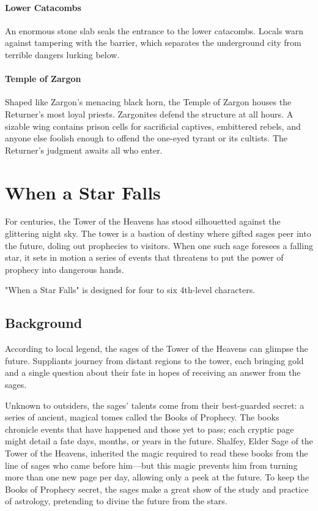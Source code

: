 \documentclass[10pt,a4paper,twoside,bg=print,twocolumn,openany,nodeprecatedcode]{dndbook}
\begin{document}
\subsubsection{Lower Catacombs}
An enormous stone slab seals the entrance to the lower catacombs. Locals warn against tampering with the barrier, which separates the underground city from terrible dangers lurking below.

\subsubsection{Temple of Zargon}
Shaped like Zargon's menacing black horn, the Temple of Zargon houses the Returner's most loyal priests. Zargonites defend the structure at all hours. A sizable wing contains prison cells for sacrificial captives, embittered rebels, and anyone else foolish enough to offend the one-eyed tyrant or its cultists. The Returner's judgment awaits all who enter.

\chapter{When a Star Falls}
For centuries, the Tower of the Heavens has stood silhouetted against the glittering night sky. The tower is a bastion of destiny where gifted sages peer into the future, doling out prophecies to visitors. When one such sage foresees a falling star, it sets in motion a series of events that threatens to put the power of prophecy into dangerous hands.

"When a Star Falls" is designed for four to six 4th-level characters.

\section{Background}
According to local legend, the sages of the Tower of the Heavens can glimpse the future. Suppliants journey from distant regions to the tower, each bringing gold and a single question about their fate in hopes of receiving an answer from the sages.

Unknown to outsiders, the sages' talents come from their best-guarded secret: a series of ancient, magical tomes called the Books of Prophecy. The books chronicle events that have happened and those yet to pass; each cryptic page might detail a fate days, months, or years in the future. Shalfey, Elder Sage of the Tower of the Heavens, inherited the magic required to read these books from the line of sages who came before him—but this magic prevents him from turning more than one new page per day, allowing only a peek at the future. To keep the Books of Prophecy secret, the sages make a great show of the study and practice of astrology, pretending to divine the future from the stars.
\end{document}
